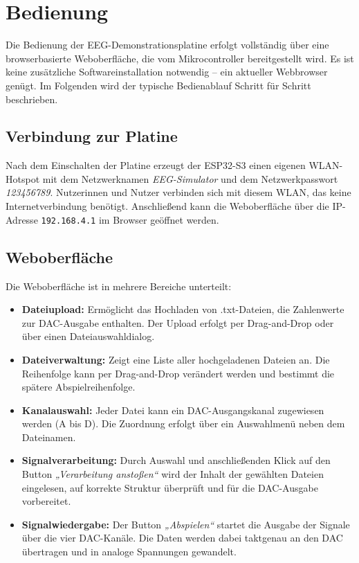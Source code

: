 \chapter{Bedienung}
\label{chap:bedienung}

Die Bedienung der EEG-Demonstrationsplatine erfolgt vollständig über eine browserbasierte Weboberfläche, die vom Mikrocontroller bereitgestellt wird. Es ist keine zusätzliche Softwareinstallation notwendig – ein aktueller Webbrowser genügt. Im Folgenden wird der typische Bedienablauf Schritt für Schritt beschrieben.

\section{Verbindung zur Platine}

Nach dem Einschalten der Platine erzeugt der ESP32-S3 einen eigenen WLAN-Hotspot mit dem Netzwerknamen \textit{EEG-Simulator} und dem Netzwerkpasswort \textit{123456789}.
Nutzerinnen und Nutzer verbinden sich mit diesem WLAN, das keine Internetverbindung benötigt. Anschließend kann die Weboberfläche über die IP-Adresse \texttt{192.168.4.1} im Browser geöffnet werden.

\section{Weboberfläche}

Die Weboberfläche ist in mehrere Bereiche unterteilt:

\begin{itemize}
  \item \textbf{Dateiupload:} Ermöglicht das Hochladen von .txt-Dateien, die Zahlenwerte zur DAC-Ausgabe enthalten. Der Upload erfolgt per Drag-and-Drop oder über einen Dateiauswahldialog.
  \item \textbf{Dateiverwaltung:} Zeigt eine Liste aller hochgeladenen Dateien an. Die Reihenfolge kann per Drag-and-Drop verändert werden und bestimmt die spätere Abspielreihenfolge.
  \item \textbf{Kanalauswahl:} Jeder Datei kann ein DAC-Ausgangskanal zugewiesen werden (A bis D). Die Zuordnung erfolgt über ein Auswahlmenü neben dem Dateinamen.
  \item \textbf{Signalverarbeitung:} Durch Auswahl und anschließenden Klick auf den Button \textit{„Verarbeitung anstoßen“} wird der Inhalt der gewählten Dateien eingelesen, auf korrekte Struktur überprüft und für die DAC-Ausgabe vorbereitet.
  \item \textbf{Signalwiedergabe:} Der Button \textit{„Abspielen“} startet die Ausgabe der Signale über die vier DAC-Kanäle. Die Daten werden dabei taktgenau an den DAC übertragen und in analoge Spannungen gewandelt.
\end{itemize}

